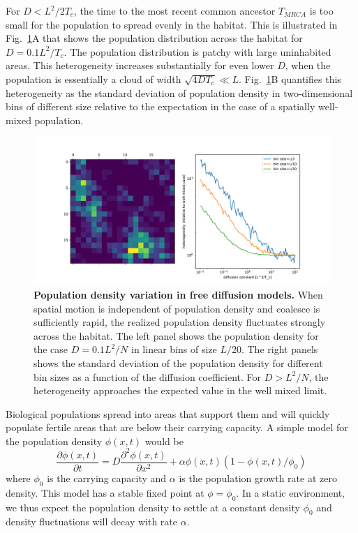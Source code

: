 \documentclass[aps,rmp, twocolumn]{revtex4}
\begin{document}
For $D<L^2/2T_c$, the time to the most recent common ancestor $T_{MRCA}$ is too small for the population to spread evenly in the habitat.
This is illustrated in Fig.~\ref{fig:heterogeneity}A that shows the population distribution across the habitat for $D=0.1L^2/T_c$. 
The population distribution is patchy with large uninhabited areas.
This heterogeneity increases substantially for even lower $D$, when the population is essentially a cloud of width $\sqrt{4DT_c}\ll L$.
Fig.~\ref{fig:heterogeneity}B quantifies this heterogeneity as the standard deviation of population density in two-dimensional bins of different size  relative to the expectation in the case of a spatially well-mixed population. 

\begin{figure}[tb]
    \includegraphics*[width=\textwidth]{figures/heterogeneity_free_diffusion.pdf}
    \caption[short]{\label{fig:heterogeneity}{\bf Population density variation in free diffusion models.}
    When spatial motion is independent of population density and coalesce is sufficiently rapid, the realized population density fluctuates strongly across the habitat. The left panel shows the population density for the case $D = 0.1 L^2/N$ in linear bins of size $L/20$. The right panels shows the standard deviation of the population density for different bin sizes as a function of the diffusion coefficient. For $D>L^2/N$, the heterogeneity approaches the expected value in the well mixed limit. }
\end{figure}

Biological populations spread into areas that support them and will quickly populate fertile areas that are below their carrying capacity.
A simple model for the population density $\phi(x,t)$ would be 
\begin{equation}
    \label{eq:FKPP}
    \frac{\partial \phi(x,t)}{\partial t} = D\frac{\partial^2 \phi(x,t)}{\partial x^2} + \alpha \phi(x,t)(1-\phi(x,t)/\phi_0)
\end{equation}
where $\phi_0$ is the carrying capacity and $\alpha$ is the population growth rate at zero density.
This model has a stable fixed point at $\phi=\phi_0$.
In a static environment, we thus expect the population density to settle at a constant density $\phi_0$ and density fluctuations will decay with rate $\alpha$. 
\end{document}

